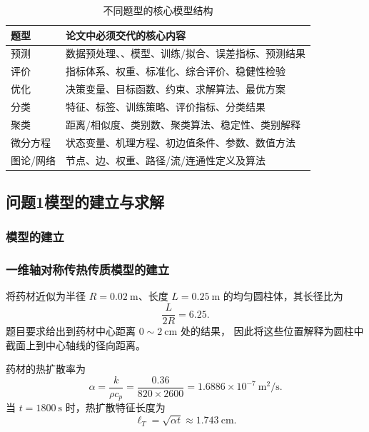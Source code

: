 \documentclass[12pt,a4paper]{article}
\begin{document}
\begin{table}[H]
\centering
\caption{不同题型的核心模型结构}
\begin{tabular}{p{3cm}p{11cm}}
\toprule
题型 & 论文中必须交代的核心内容 \\
\midrule
预测 & 数据预处理、、模型、训练/拟合、误差指标、预测结果 \\
评价 & 指标体系、权重、标准化、综合评价、稳健性检验 \\
优化 & 决策变量、目标函数、约束、求解算法、最优方案 \\
分类 & 特征、标签、训练策略、评价指标、分类结果 \\
聚类 & 距离/相似度、类别数、聚类算法、稳定性、类别解释 \\
微分方程 & 状态变量、机理方程、初边值条件、参数、数值方法 \\
图论/网络 & 节点、边、权重、路径/流/连通性定义及算法 \\
\bottomrule
\end{tabular}
\end{table}

\subsection{问题1模型的建立与求解}

\subsubsection{模型的建立}

\subsubsection{一维轴对称传热传质模型的建立}

将药材近似为半径 $R=0.02\ \mathrm{m}$、长度 $L=0.25\ \mathrm{m}$
的均匀圆柱体，其长径比为
\begin{equation}
\frac{L}{2R}=6.25.
\end{equation}
题目要求给出到药材中心距离 $0\sim2\ \mathrm{cm}$ 处的结果，
因此将这些位置解释为圆柱中截面上到中心轴线的径向距离。

药材的热扩散率为
\begin{equation}
\alpha=\frac{k}{\rho c_p}
=\frac{0.36}{820\times2600}
=1.6886\times10^{-7}\ \mathrm{m^2/s}.
\end{equation}
当 $t=1800\ \mathrm{s}$ 时，热扩散特征长度为
\begin{equation}
\ell_T=\sqrt{\alpha t}\approx1.743\ \mathrm{cm}.
\end{equation}
\end{document}
